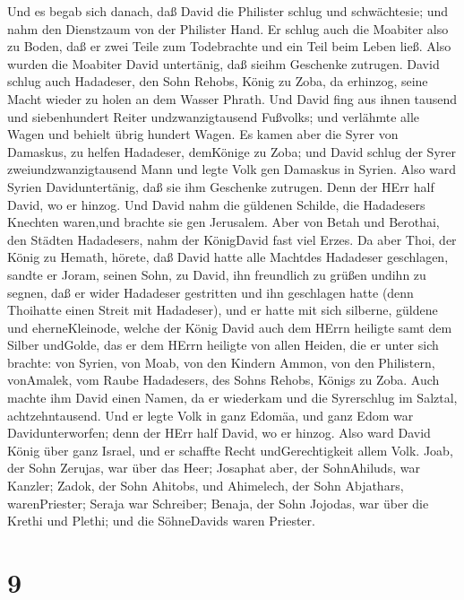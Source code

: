  Und es begab sich danach, daß David die Philister schlug
und schwächtesie; und nahm den Dienstzaum von der Philister Hand.
 Er schlug auch die Moabiter also zu Boden, daß er zwei
Teile zum Todebrachte und ein Teil beim Leben ließ. Also wurden die
Moabiter David untertänig, daß sieihm Geschenke zutrugen. 
David schlug auch Hadadeser, den Sohn Rehobs, König zu Zoba, da
erhinzog, seine Macht wieder zu holen an dem Wasser Phrath. 
Und David fing aus ihnen tausend und siebenhundert Reiter
undzwanzigtausend Fußvolks; und verlähmte alle Wagen und behielt übrig
hundert Wagen.  Es kamen aber die Syrer von Damaskus, zu
helfen Hadadeser, demKönige zu Zoba; und David schlug der Syrer
zweiundzwanzigtausend Mann  und legte Volk gen Damaskus in
Syrien. Also ward Syrien Daviduntertänig, daß sie ihm Geschenke
zutrugen. Denn der HErr half David, wo er hinzog.  Und David
nahm die güldenen Schilde, die Hadadesers Knechten waren,und brachte sie
gen Jerusalem.  Aber von Betah und Berothai, den Städten
Hadadesers, nahm der KönigDavid fast viel Erzes.  Da aber
Thoi, der König zu Hemath, hörete, daß David hatte alle Machtdes
Hadadeser geschlagen,  sandte er Joram, seinen Sohn, zu
David, ihn freundlich zu grüßen undihn zu segnen, daß er wider Hadadeser
gestritten und ihn geschlagen hatte (denn Thoihatte einen Streit mit
Hadadeser), und er hatte mit sich silberne, güldene und eherneKleinode,
 welche der König David auch dem HErrn heiligte samt dem
Silber undGolde, das er dem HErrn heiligte von allen Heiden, die er
unter sich brachte:  von Syrien, von Moab, von den Kindern
Ammon, von den Philistern, vonAmalek, vom Raube Hadadesers, des Sohns
Rehobs, Königs zu Zoba.  Auch machte ihm David einen Namen,
da er wiederkam und die Syrerschlug im Salztal, achtzehntausend.
 Und er legte Volk in ganz Edomäa, und ganz Edom war
Davidunterworfen; denn der HErr half David, wo er hinzog. 
Also ward David König über ganz Israel, und er schaffte Recht
undGerechtigkeit allem Volk.  Joab, der Sohn Zerujas, war
über das Heer; Josaphat aber, der SohnAhiluds, war Kanzler;
 Zadok, der Sohn Ahitobs, und Ahimelech, der Sohn
Abjathars, warenPriester; Seraja war Schreiber;  Benaja,
der Sohn Jojodas, war über die Krethi und Plethi; und die SöhneDavids
waren Priester.

\hypertarget{section-8}{%
\section{9}\label{section-8}}

